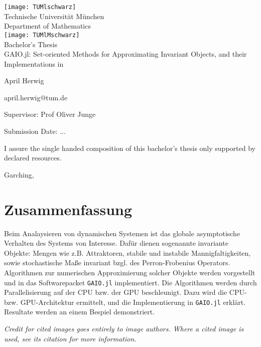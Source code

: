 \pagestyle{empty}
\begin{titlepage}
\begin{center}
\texttt{[image: TUMlschwarz]}\\[3mm]
\sf
{\Large
  Technische Universit\"at M\"unchen\\[5mm]
  Department of Mathematics\\[8mm]
}
\normalsize
\texttt{[image: TUMlMschwarz]}\\[15mm]

Bachelor's Thesis\\[15mm]

{\LARGE
  GAIO.jl: Set-oriented Methods for Approximating Invariant Objects, and their Implementations in {\Huge \julia}
}
\bigskip

\normalsize

April Herwig

april.herwig@tum.de
\end{center}
\vspace*{75mm}

Supervisor: Prof Oliver Junge
\medskip

Submission Date: ... %

\end{titlepage}

\vspace*{150mm}

I assure the single handed composition of this bachelor's thesis only supported by declared resources.
\bigskip

Garching, %
\newpage
\section*{Zusammenfassung}

Beim Analaysieren von dynamischen Systemen ist das globale asymptotische Verhalten des Systems von Interesse. Dafür 
dienen sogenannte invariante Objekte: Mengen wie z.B. Attraktoren, stabile und instabile Mannigfaltigkeiten, 
sowie stochastische Maße invariant bzgl. des Perron-Frobenius Operators. Algorithmen zur numerischen 
Approximierung solcher Objekte werden vorgestellt und in das Softwarepacket \texttt{GAIO.jl} implementiert. 
Die Algorithmen werden durch Parallelisierung auf der CPU bzw. der GPU beschleunigt. Dazu wird die 
CPU- bzw. GPU-Architektur ermittelt, und die Implementierung in \texttt{GAIO.jl} erklärt. Resultate 
werden an einem Bespiel demonstriert. 

\newpage
\tableofcontents
\vspace*{10ex}

\begin{remark}
  \textit{
      Credit for cited images goes entirely to image authors.
      Where a cited image is used, see its citation for more information.
  }
\end{remark}

\newpage

